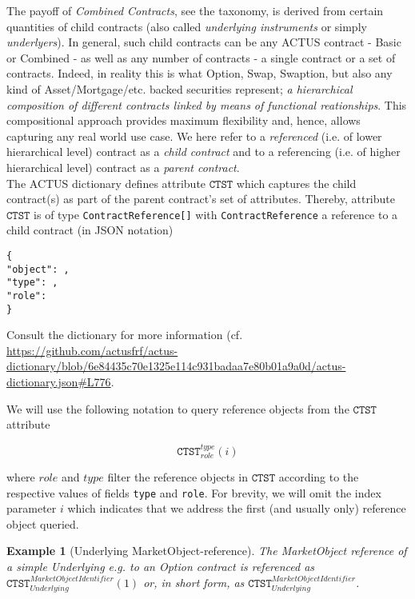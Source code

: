 \documentclass[9pt,oneside]{amsart}
\newtheorem{example}{Example}
\newcommand{\attr}[1]{\texttt{#1}}
\begin{document}
\begin{multicols}{2}
The payoff of \textit{Combined Contracts}, see the taxonomy, is derived from certain quantities of child contracts (also called \textit{underlying instruments} or simply \textit{underlyers}). In general, such child contracts can be any ACTUS contract - Basic or Combined - as well as any number of contracts - a single contract or a set of contracts. Indeed, in reality this is what Option, Swap, Swaption, but also any kind of Asset/Mortgage/etc. backed securities represent; \textit{a hierarchical composition of different contracts linked by means of functional reationships}. This compositional approach provides maximum flexibility and, hence, allows capturing any real world use case. We here refer to a \textit{referenced} (i.e. of lower hierarchical level) contract as a \textit{child contract} and to a referencing (i.e. of higher hierarchical level) contract as a \textit{parent contract}.\\

The ACTUS dictionary defines attribute $\attr{CTST}$ which captures the child contract(s) as part of the parent contract's set of attributes. Thereby, attribute $\attr{CTST}$ is of type \verb'ContractReference[]' with \verb'ContractReference' a reference to a child contract (in JSON notation)

\begin{verbatim}
{
"object": ,
"type": ,
"role":
}
\end{verbatim}

Consult the dictionary for more information (cf. \url{https://github.com/actusfrf/actus-dictionary/blob/6e84435c70e1325e114c931badaa7e80b01a9a0d/actus-dictionary.json#L776}.

We will use the following notation to query reference objects from the $\attr{CTST}$ attribute

\[
	\attr{CTST}_{role}^{type}(i)
\]

where $role$ and $type$ filter the reference objects in $\attr{CTST}$ according to the respective values of fields \verb'type' and \verb'role'. For brevity, we will omit the index parameter $i$ which indicates that we address the first (and usually only) reference object queried.

\begin{example}[Underlying MarketObject-reference] The MarketObject reference of a simple Underlying e.g. to an Option contract is referenced as $\attr{CTST}_{Underlying}^{MarketObjectIdentifier}(1)$ or, in short form, as $\attr{CTST}_{Underlying}^{MarketObjectIdentifier}$.
\end{example}


\end{multicols}
\end{document}
